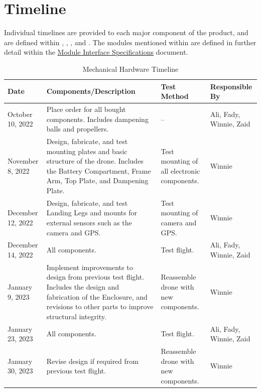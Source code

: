 \documentclass[12pt, titlepage]{article}
\begin{document}
\clearpage

\section{Timeline}
\label{sec:timeline}

Individual timelines are provided to each major component of the product, and are defined within , , , and . The modules mentioned within  are defined in further detail within the  \href{https://github.com/icecap360/DroneCapstone/blob/master/docs/Design/SoftDetailedDes/MIS.pdf}{Module Interface Specifications} document.

\begin{table}[!h]
\begin{center}
\caption {Mechanical Hardware Timeline}
\label{tab:mechTimeline}
\begin{tabular}{ | m{2.5cm} | m{7.5cm} | m{3cm} | m{2cm} | } 
\hline
Date & Components/Description & Test Method & Responsible By \\
\hline
October 10, 2022 & Place order for all bought components. Includes dampening balls and propellers. & 
    -- & Ali, Fady, Winnie, Zaid \\
\hline
November 8, 2022 & Design, fabricate, and test mounting plates and basic structure of the drone. Includes the Battery Compartment, Frame Arm, Top Plate, and Dampening Plate. & 
    Test mounting of all electronic components. & Winnie \\
\hline
December 12, 2022 & Design, fabricate, and test Landing Legs and mounts for external sensors such as the camera and GPS. & 
    Test mounting of camera and GPS. & Winnie \\
\hline
December 14, 2022 & All components. & 
    Test flight. & Ali, Fady, Winnie, Zaid \\
\hline
January 9, 2023 & Implement improvements to design from previous test flight. Includes the design and fabrication of the Enclosure, and revisions to other parts to improve structural integrity. & 
    Reassemble drone with new components. & Winnie \\
\hline
January 23, 2023 & All components. & 
    Test flight. & Ali, Fady, Winnie, Zaid \\
\hline
January 30, 2023 & Revise design if required from previous test flight. & 
    Reassemble drone with new components. & Winnie \\
\hline
\end{tabular}
\end{center}
\end{table}
\end{document}

